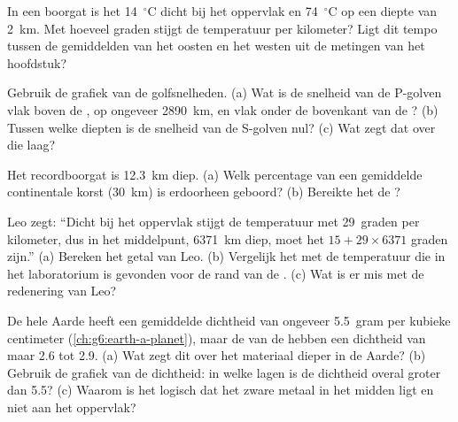 \begin{exercise}[$\star\star$]\label{exo:g6:inside-the-earth:8}
In een boorgat is het  14~$^\circ$C dicht bij het oppervlak en
74~$^\circ$C op een diepte van 2~km. Met hoeveel graden stijgt de
temperatuur per kilometer? Ligt dit tempo tussen de gemiddelden van het
oosten en het westen uit de metingen van het hoofdstuk?
\end{exercise}

\begin{exercise}[$\star\star$]\label{exo:g6:inside-the-earth:9}
Gebruik de grafiek van de golfsnelheden. (a) Wat is de snelheid van de
P-golven vlak boven de , op ongeveer 2890~km, en vlak onder de
bovenkant van de ? (b) Tussen welke diepten is de snelheid van de
S-golven nul? (c) Wat zegt dat over die laag?
\end{exercise}

\begin{exercise}[$\star\star$]\label{exo:g6:inside-the-earth:10}
Het recordboorgat is 12.3~km diep. (a) Welk percentage van een gemiddelde
continentale korst (30~km) is erdoorheen geboord? (b) Bereikte het de
?
\end{exercise}

\begin{exercise}[$\star\star\star$]\label{exo:g6:inside-the-earth:11}
Leo zegt: ``Dicht bij het oppervlak stijgt de temperatuur met 29~graden
per kilometer, dus in het middelpunt, 6371~km diep, moet het
$15 + 29 \times 6371$ graden zijn.'' (a) Bereken het getal van Leo.
(b) Vergelijk het met de temperatuur die in het laboratorium is gevonden
voor de rand van de . (c) Wat is er mis met de redenering van
Leo?
\end{exercise}

\begin{exercise}[$\star\star\star$]\label{exo:g6:inside-the-earth:12}
De hele Aarde heeft een gemiddelde dichtheid van ongeveer 5.5~gram per
kubieke centimeter (\cref{ch:g6:earth-a-planet}), maar de  van de
 hebben een dichtheid van maar 2.6 tot 2.9. (a) Wat zegt dit over
het materiaal dieper in de Aarde? (b) Gebruik de grafiek van de dichtheid:
in welke lagen is de dichtheid overal groter dan 5.5? (c) Waarom is het
logisch dat het zware metaal in het midden ligt en niet aan het oppervlak?
\end{exercise}

